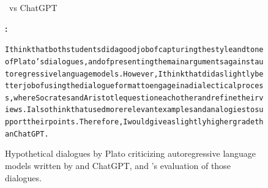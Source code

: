 \begin{figure}
\begin{AIbox}{\DV \ vs ChatGPT}
\parbox[t]{1.0\linewidth}{{\bf \DV:} \scriptsize \begin{alltt}
I think that both students did a good job of capturing the style and tone of Plato's dialogues, and of presenting the main arguments against autoregressive language models. However, I think that {\DV} did a slightly better job of using the dialogue format to engage in a dialectical process, where Socrates and Aristotle question each other and refine their views. I also think that {\DV} used more relevant examples and analogies to support their points. Therefore, I would give {\DV} a slightly higher grade than ChatGPT. \end{alltt}}
\end{AIbox}
	\caption{Hypothetical dialogues by Plato criticizing autoregressive language models written by {\DV} and ChatGPT, and {\DV}'s evaluation of those dialogues.}	\label{fig:platonic1}
\end{figure}


